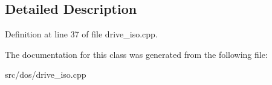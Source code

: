 \subsection{Detailed Description}


Definition at line 37 of file drive\-\_\-iso.\-cpp.



The documentation for this class was generated from the following file\-:\begin{DoxyCompactItemize}
\item 
src/dos/drive\-\_\-iso.\-cpp\end{DoxyCompactItemize}
